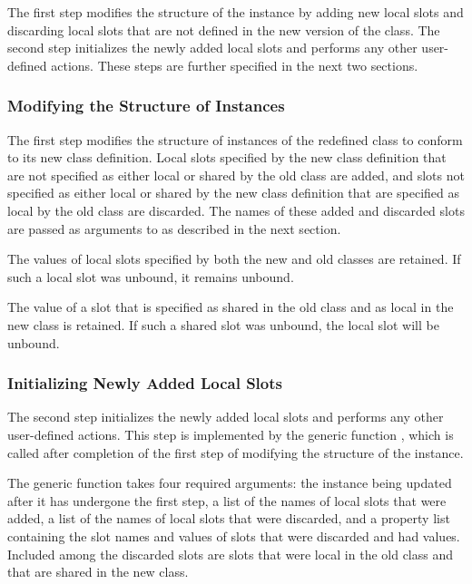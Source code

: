 The first step modifies the structure of the instance by adding new
local slots and discarding local slots that are not defined in the new
version of the class.
The second step initializes the newly added local slots and performs
any other user-defined actions. These steps are further specified
in the next two sections.

\subsubsection{Modifying the Structure of Instances}

The first step modifies the structure of instances of the redefined
class to conform to its new class definition.  Local slots specified
by the new class definition that are not specified as either local or
shared by the old class are added, and slots not specified as either
local or shared by the new class definition that are specified as
local by the old class are discarded. The names of these added and discarded
slots are passed as arguments to 
as described in the next section.

The values of local slots specified by both the new and old classes
are retained. If such a local slot was unbound, it remains unbound.

The value of a slot that is specified as shared in the old class and
as local in the new class is retained.  If such a shared slot was
unbound, the local slot will be unbound.


\subsubsection{Initializing Newly Added Local Slots}

The second step initializes the newly added local slots and performs
any other user-defined actions.  This step is implemented by the generic
function , which is called after
completion of the first step of modifying the structure of the
instance.

The generic function  takes
four required arguments: the instance being updated after it has
undergone the first step, a list of the names of local slots that were
added, a list of the names of local slots that were discarded, and a
property list containing the slot names and values of slots that were
discarded and had values.  Included among the discarded slots are
slots that were local in the old class and that are shared in the new
class.

